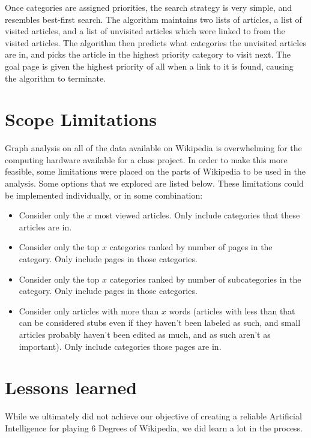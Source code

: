 \documentclass{article}
\begin{document}
Once categories are assigned priorities, the search strategy is very simple, and resembles best-first search.
The algorithm maintains two lists of articles, a list of visited articles,
and a list of unvisited articles which were linked to from the visited articles.
The algorithm then predicts what categories the unvisited articles are in,
and picks the article in the highest priority category to visit next.
The goal page is given the highest priority of all when a link to it is found,
causing the algorithm to terminate.

\section{Scope Limitations}
Graph analysis on all of the data available on Wikipedia is overwhelming for the
computing hardware available for a class project. In order to make this more
feasible, some limitations were placed on the parts of Wikipedia to be used in
the analysis. Some options that we explored are listed below. These
limitations could be implemented individually, or in some combination:

\begin{itemize}
\item Consider only the $x$ most viewed articles. Only include categories that
  these articles are in.

\item Consider only the top $x$ categories ranked by number of pages in the
  category. Only include pages in those categories.

\item Consider only the top $x$ categories ranked by number of subcategories in the
  category. Only include pages in those categories.

\item Consider only articles with more than $x$ words (articles with less than
  that can be considered stubs even if they haven't been labeled as such, and
  small articles probably haven't been edited as much, and as such aren't as
  important). Only include categories those pages are in.
\end{itemize}

\section{Lessons learned}
While we ultimately did not achieve our objective of creating a reliable
Artificial Intelligence for playing 6 Degrees of Wikipedia,
we did learn a lot in the process.
\end{document}
